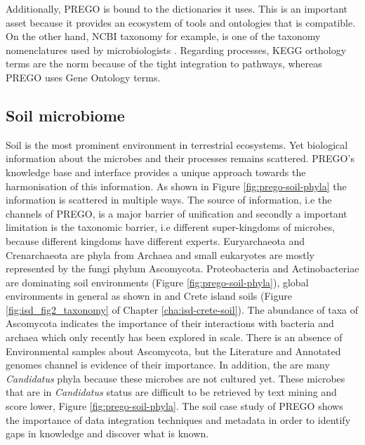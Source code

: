 Additionally, PREGO is bound to the dictionaries it uses.
This is an important asset because it provides an ecosystem of tools
and ontologies that is compatible. On the other hand, NCBI taxonomy 
for example, is one of the taxonomy nomenclatures used by microbiologists \parencite{sanford2021microbial}.
Regarding processes, KEGG orthology terms are the norm because of the tight 
integration to pathways, whereas PREGO uses Gene Ontology terms.

   \subsection{Soil microbiome}
   \label{subsec:prego-soil}

Soil is the most prominent environment in terrestrial ecosystems. Yet 
biological information about the microbes and their processes remains 
scattered. PREGO's knowledge base and interface provides a unique 
approach towards the harmonisation of this information. As shown 
in Figure \ref{fig:prego-soil-phyla} the information is scattered in multiple ways.
The source of information, i.e the channels of PREGO, is a major barrier of unification and
secondly a important limitation is the taxonomic barrier, i.e
different super-kingdoms of microbes, because different kingdoms have different experts.
Euryarchaeota and Crenarchaeota are phyla from
Archaea and 
small eukaryotes are mostly represented by the fungi phylum Ascomycota. Proteobacteria
and Actinobacteriae are dominating soil environments (Figure \ref{fig:prego-soil-phyla}),
global environments in general as shown in \textcite{microorganisms10020293} 
and Crete island soils (Figure \ref{fig:isd_fig2_taxonomy} of Chapter \ref{cha:isd-crete-soil}).
The abundance of taxa of Ascomycota indicates the importance of their interactions 
with bacteria and archaea which only recently has been explored \parencite{Labouyrie2023} in scale. 
There is an absence of Environmental samples about Ascomycota, but the Literature and Annotated genomes 
channel is evidence of their importance.
In addition, the are many \textit{Candidatus} phyla because these microbes are not 
cultured yet. These microbes that are in \textit{Candidatus} status are difficult to 
be retrieved by text mining and score lower, Figure \ref{fig:prego-soil-phyla}.
The soil case study of PREGO shows the importance of data integration techniques
and metadata in order to identify gaps in knowledge and discover what is known.


